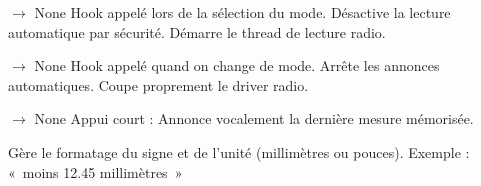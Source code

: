 \documentclass[letterpaper,10pt,french]{sphinxmanual}
\begin{document}
\begin{fulllineitems}
\begin{fulllineitems}
\begin{description}
\end{description}

\end{fulllineitems}


\begin{fulllineitems}
\label{\detokenize{api/modes:modes.mode_caliper.ModeCaliper.on_enter}}
\pysigstartsignatures
\pysiglinewithargsret
{}
{}
{{ $\rightarrow$ None}}
\pysigstopsignatures
\sphinxAtStartPar
Hook appelé lors de la sélection du mode.
\sphinxhyphen{} Désactive la lecture automatique par sécurité.
\sphinxhyphen{} Démarre le thread de lecture radio.

\end{fulllineitems}


\begin{fulllineitems}
\label{\detokenize{api/modes:modes.mode_caliper.ModeCaliper.on_exit}}
\pysigstartsignatures
\pysiglinewithargsret
{}
{}
{{ $\rightarrow$ None}}
\pysigstopsignatures
\sphinxAtStartPar
Hook appelé quand on change de mode.
\sphinxhyphen{} Arrête les annonces automatiques.
\sphinxhyphen{} Coupe proprement le driver radio.

\end{fulllineitems}


\begin{fulllineitems}
\label{\detokenize{api/modes:modes.mode_caliper.ModeCaliper.on_short_press}}
\pysigstartsignatures
\pysiglinewithargsret
{}
{}
{{ $\rightarrow$ None}}
\pysigstopsignatures
\sphinxAtStartPar
Appui court : Annonce vocalement la dernière mesure mémorisée.

\sphinxAtStartPar
Gère le formatage du signe et de l’unité (millimètres ou pouces).
Exemple : « moins 12.45 millimètres »

\end{fulllineitems}


\end{fulllineitems}
\end{document}
